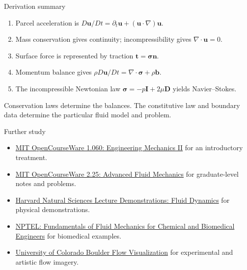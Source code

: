 \documentclass[aspectratio=169,11pt]{beamer}
\newcommand{\uvec}{\bm{u}}
\newcommand{\nvec}{\bm{n}}
\newcommand{\bvec}{\bm{b}}
\newcommand{\tvec}{\bm{t}}
\newcommand{\stress}{\bm{\sigma}}
\newcommand{\Dtensor}{\mathbf{D}}
\newcommand{\Identity}{\mathbf{I}}
\begin{document}
\begin{frame}{Derivation summary}
\begin{enumerate}\itemsep8pt
  \item Parcel acceleration is $D\uvec/Dt=\partial_t\uvec+(\uvec\cdot\nabla)\uvec$.
  \item Mass conservation gives continuity; incompressibility gives $\nabla\cdot\uvec=0$.
  \item Surface force is represented by traction $\tvec=\stress\nvec$.
  \item Momentum balance gives $\rho D\uvec/Dt=\nabla\cdot\stress+\rho\bvec$.
  \item The incompressible Newtonian law $\stress=-p\Identity+2\mu\Dtensor$ yields Navier--Stokes.
\end{enumerate}
\begin{punchbox}
\centering
\small Conservation laws determine the balances. The constitutive law and boundary data determine the particular fluid model and problem.
\end{punchbox}
\end{frame}

\begin{frame}{Further study}
\small
\begin{itemize}\itemsep7pt
  \item \href{https://ocw.mit.edu/courses/1-060-engineering-mechanics-ii-spring-2006/}{MIT OpenCourseWare 1.060: Engineering Mechanics II} for an introductory treatment.
  \item \href{https://ocw.mit.edu/courses/2-25-advanced-fluid-mechanics-fall-2013/}{MIT OpenCourseWare 2.25: Advanced Fluid Mechanics} for graduate-level notes and problems.
  \item \href{https://sciencedemonstrations.fas.harvard.edu/fluid-dynamics}{Harvard Natural Sciences Lecture Demonstrations: Fluid Dynamics} for physical demonstrations.
  \item \href{https://onlinecourses.nptel.ac.in/noc22_ge11/preview}{NPTEL: Fundamentals of Fluid Mechanics for Chemical and Biomedical Engineers} for biomedical examples.
  \item \href{https://www.flowvis.org/}{University of Colorado Boulder Flow Visualization} for experimental and artistic flow imagery.
\end{itemize}
\end{frame}
\end{document}
